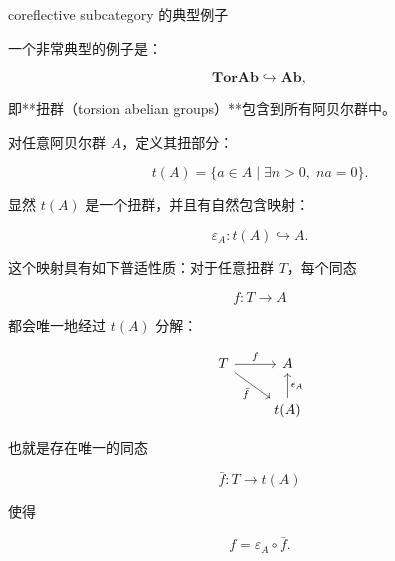 \documentclass{beamer}
\begin{document}
\begin{frame}{coreflective subcategory 的典型例子}
\begin{markdown}
一个非常典型的例子是：

$$
\mathbf{TorAb}\hookrightarrow \mathbf{Ab},
$$

即**扭群（torsion abelian groups）**包含到所有阿贝尔群中。

对任意阿贝尔群 $A$，定义其扭部分：

$$
t(A)=\{a\in A\mid \exists n>0,\;na=0\}.
$$

显然 $t(A)$ 是一个扭群，并且有自然包含映射：

$$
\varepsilon_A:t(A)\hookrightarrow A.
$$

这个映射具有如下普适性质：对于任意扭群 $T$，每个同态

$$
f:T\to A
$$

都会唯一地经过 $t(A)$ 分解：
\end{markdown}
\[
\begin{tikzcd}
T \arrow[r,"f"] \arrow[dr,"\bar{f}"'] & A \\
& t(A) \arrow[u,"\epsilon_A"']
\end{tikzcd}
\]
\begin{markdown}
也就是存在唯一的同态

$$
\bar f:T\to t(A)
$$

使得

$$
f=\varepsilon_A\circ\bar f.
$$
\end{markdown}
\end{frame}
\end{document}
